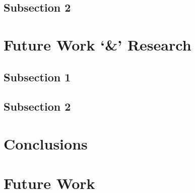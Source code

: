 \subsection{Subsection 2}




\section{Future Work `\&' Research}


\subsection{Subsection 1}




\subsection{Subsection 2}





\section{Conclusions}

\section{Future Work}

